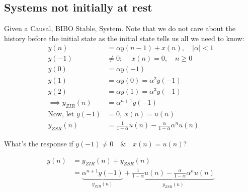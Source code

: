 \subsection{Systems not initially at rest}
Given a Causal, BIBO Stable, System. Note that we do not care about the history before the initial state as the initial state tells us all we need to know:
\begin{align*}
    y(n)
    &= \alpha y(n-1)+x(n),\quad|\alpha|<1
    \\
    y(-1)
    &\neq 0;\quad \ x(n)=0,\quad n\ge0
    \\
    y(0)
    &=\alpha y(-1)
    \\
    y(1)
    &=\alpha y(0)=\alpha^2 y(-1)
    \\
    y(2)
    &=\alpha y(1)=\alpha^3 y(-1)
    \\
    \implies
    y_{ZIR}(n)
    &=\alpha^{n+1} y(-1)
    \\
    \text{Now, let } y(-1)
    &=0,\ x(n)=u(n)
    \\
    y_{ZSR}(n)
    &=
    {\frac{1}{1-\alpha}u(n)} - {\frac{\alpha}{1-\alpha}\alpha^n u(n)}
\end{align*}
\begin{shaded}
What's the response if $y(-1)\neq0\quad\&\quad x(n)=u(n)$?
\end{shaded}
\begin{align*}
    y(n)
    &= y_{ZIR}(n) + y_{ZSR}(n)
    \\
    &= \underbrace{\alpha^{n+1}y(-1)}_{y_{ZIR}(n)}
    + \underbrace{\frac{1}{1-\alpha}u(n) - \frac{\alpha}{1-\alpha}\alpha^n u(n)}_{y_{ZSR}(n)}
\end{align*}
\hrulefill
